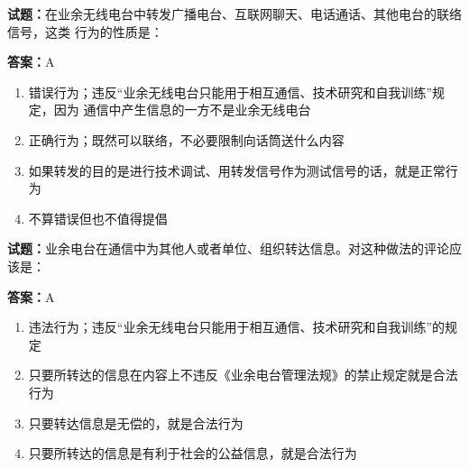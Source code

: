 \documentclass{ctexbook}
\begin{document}




\vspace{1em}

\textbf{试题：}在业余无线电台中转发广播电台、互联网聊天、电话通话、其他电台的联络信号，这类
行为的性质是： 

\textbf{答案：}A 

\begin{enumerate}[leftmargin=3em]
  \item 错误行为；违反“业余无线电台只能用于相互通信、技术研究和自我训练”规定，因为
通信中产生信息的一方不是业余无线电台 

  \item 正确行为；既然可以联络，不必要限制向话筒送什么内容 


  \item 如果转发的目的是进行技术调试、用转发信号作为测试信号的话，就是正常行为 

  \item 不算错误但也不值得提倡 

\end{enumerate}





\vspace{1em}

\textbf{试题：}业余电台在通信中为其他人或者单位、组织转达信息。对这种做法的评论应该是： 

\textbf{答案：}A 

\begin{enumerate}[leftmargin=3em]
  \item 违法行为；违反“业余无线电台只能用于相互通信、技术研究和自我训练”的规定 

  \item 只要所转达的信息在内容上不违反《业余电台管理法规》的禁止规定就是合法行为 

  \item 只要转达信息是无偿的，就是合法行为 

  \item 只要所转达的信息是有利于社会的公益信息，就是合法行为 

\end{enumerate}



\end{document}
